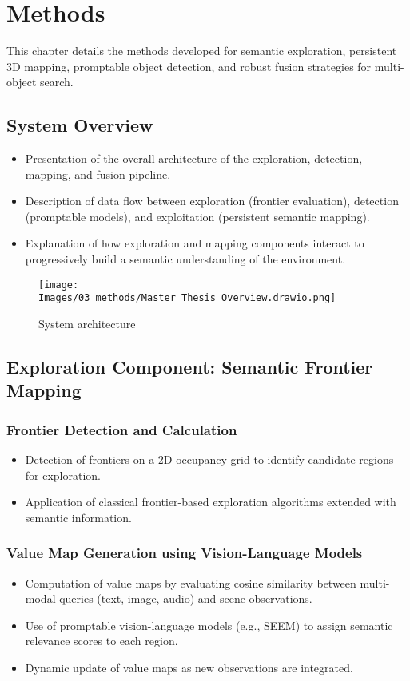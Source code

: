 \chapter{Methods}
This chapter details the methods developed for semantic exploration, persistent 3D mapping, promptable object detection, and robust fusion strategies for multi-object search. 

\section{System Overview}
\begin{itemize}
    \item Presentation of the overall architecture of the exploration, detection, mapping, and fusion pipeline.
    \item Description of data flow between exploration (frontier evaluation), detection (promptable models), and exploitation (persistent semantic mapping).
    \item Explanation of how exploration and mapping components interact to progressively build a semantic understanding of the environment.
\end{itemize}

\begin{figure}[h!]
    \centering
    \texttt{[image: Images/03\_methods/Master\_Thesis\_Overview.drawio.png]}
    \caption{System architecture}
    \label{fig:system_overview}
\end{figure}

\section{Exploration Component: Semantic Frontier Mapping}
\subsection{Frontier Detection and Calculation}
\begin{itemize}
    \item Detection of frontiers on a 2D occupancy grid to identify candidate regions for exploration.
    \item Application of classical frontier-based exploration algorithms extended with semantic information.
\end{itemize}

\subsection{Value Map Generation using Vision-Language Models}
\begin{itemize}
    \item Computation of value maps by evaluating cosine similarity between multi-modal queries (text, image, audio) and scene observations.
    \item Use of promptable vision-language models (e.g., SEEM) to assign semantic relevance scores to each region.
    \item Dynamic update of value maps as new observations are integrated.
\end{itemize}

